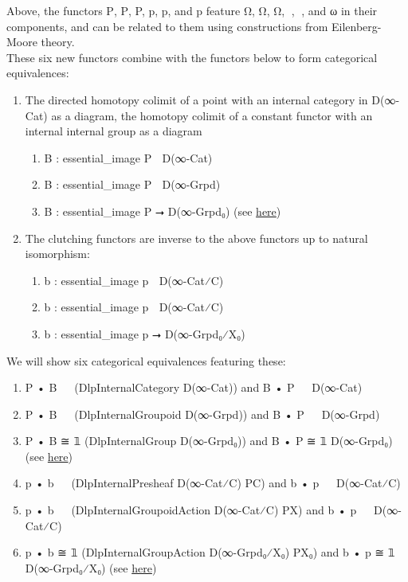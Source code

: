 \documentclass{book}
\theoremstyle{definition}
\begin{document}
Above, the functors P⃗, P⃡, P, p⃗, p⃡, and p feature Ω⃗, Ω⃡, Ω, ω⃗, ω⃡, and ω in their components, and can be related to them using constructions from Eilenberg-Moore theory.\\

These six new functors combine with the functors below to form categorical equivalences:\\

\begin{enumerate}
\item The directed homotopy colimit of a point with an internal category in D(∞-Cat) as a diagram, the homotopy colimit of a constant functor with an internal internal group as a diagram
\begin{enumerate}
\item B⃗ : essential\_image P⃗ ⭢ D(∞-Cat)
\item B⃡ : essential\_image P⃡ ⭢ D(∞-Grpd)
\item B : essential\_image P ⭢ D(∞-Grpd₀) (see \href{https://mathoverflow.net/questions/128883/why-omega-x-and-bg-are-adjoint-functors}{here})
\end{enumerate}
\item The clutching functors are inverse to the above functors up to natural isomorphism:
\begin{enumerate}
\item b⃗ : essential\_image p⃗ ⭢ D(∞-Cat⁄C)
\item b⃡ : essential\_image p⃡ ⭢ D(∞-Cat⁄C)
\item b : essential\_image p ⭢ D(∞-Grpd₀⁄X₀) 
\end{enumerate}
\end{enumerate}

We will show six categorical equivalences featuring these:

\begin{enumerate}
\item P⃗ • B⃗ ≅ 𝟙 (DlpInternalCategory D(∞-Cat)) and B⃗ • P⃗ ≅ 𝟙 D(∞-Cat)
\item P⃡ • B⃡ ≅ 𝟙 (DlpInternalGroupoid D(∞-Grpd)) and B⃡ • P⃡ ≅ 𝟙 D(∞-Grpd)
\item P • B ≅ 𝟙 (DlpInternalGroup D(∞-Grpd₀)) and B • P ≅ 𝟙 D(∞-Grpd₀) (see \href{https://mathoverflow.net/questions/128883/why-omega-x-and-bg-are-adjoint-functors}{here})
\item p⃗ • b⃗ ≅ 𝟙 (DlpInternalPresheaf D(∞-Cat⁄C) P⃗C) and b⃗ • p⃗ ≅ 𝟙 D(∞-Cat⁄C)
\item p⃡ • b⃡ ≅ 𝟙 (DlpInternalGroupoidAction D(∞-Cat⁄C) P⃡X) and b⃡ • p⃡ ≅ 𝟙 D(∞-Cat⁄C) 
\item p • b ≅ 𝟙 (DlpInternalGroupAction D(∞-Grpd₀⁄X₀) PX₀) and b • p ≅ 𝟙 D(∞-Grpd₀⁄X₀) (see \href{https://en.wikipedia.org/wiki/Principal_bundle}{here})
\end{enumerate}
\end{document}
